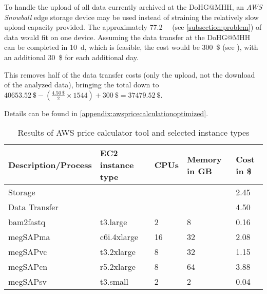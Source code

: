To handle the upload of all data currently archived at the \ac{DoHG@MHH}, an \textit{\ac{AWS} Snowball} edge storage device may be used instead of straining the relatively slow upload capacity provided. The approximately \SI{77.2}{\tera\byte} (see \cref{subsection:problem}) of data would fit on one device. Assuming the data transfer at the \ac{DoHG@MHH} can be completed in \SI{10}{\day}, which is feasible, the cost would be \SI{300}{\$} (see \autocite{AmazonWebServices2023b}), with an additional \SI{30}{\$} for each additional day.

This removes half of the data transfer costs (only the upload, not the download of the analyzed data), bringing the total down to $\SI{40653.52}{\$}-\left(\frac{\SI{4.50}{\$}}{2}\times1544\right)+\SI{300}{\$}=\SI{37479.52}{\$}$.

\begin{table}[H]
    \centering
    \caption{Results of \ac{AWS} price calculator tool and selected instance types}{Details can be found in \cref{appendix:awspricecalculationoptimized}.\\\smallskip}
    \label{table:awscostandtypes}
    \begin{tabularx}{\textwidth}{lXYYY}
        \toprule
        Description/Process & EC2 instance type & CPUs & Memory in GB & Cost in \unit{\$} \\
        \midrule
        Storage & & & & 2.45 \\ 
        Data Transfer & & & & 4.50 \\
        bam2fastq & t3.large & 2 & 8 & 0.16 \\
        megSAPma & c6i.4xlarge & 16 & 32 & 2.08 \\ 
        megSAPvc & t3.2xlarge & 8 & 32 & 1.15 \\ 
        megSAPcn & r5.2xlarge & 8 & 64 & 3.88 \\ 
        megSAPsv & t3.small & 2 & 2 & 0.04 \\
        \bottomrule
    \end{tabularx}
\end{table}
